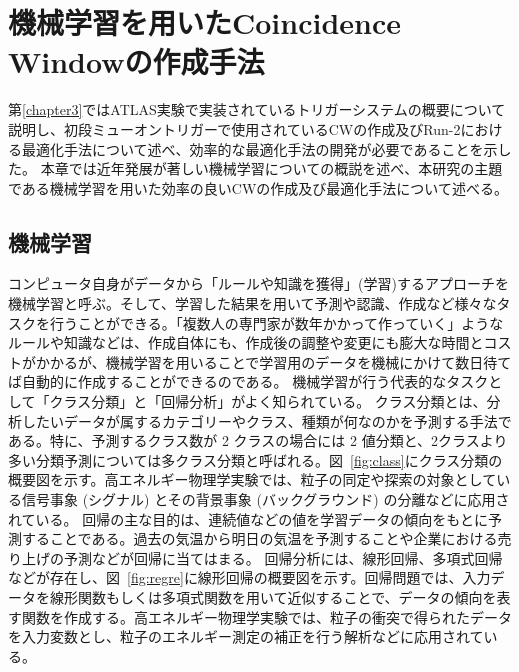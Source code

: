 \chapter{機械学習を用いたCoincidence Windowの作成手法}\label{chapter4}
第\ref{chapter3}ではATLAS実験で実装されているトリガーシステムの概要について説明し、初段ミューオントリガーで使用されているCWの作成及びRun-2における最適化手法について述べ、効率的な最適化手法の開発が必要であることを示した。
本章では近年発展が著しい機械学習についての概説を述べ、本研究の主題である機械学習を用いた効率の良いCWの作成及び最適化手法について述べる。

\section{機械学習}\label{回帰分析}
コンピュータ自身がデータから「ルールや知識を獲得」(学習)するアプローチを機械学習と呼ぶ。そして、学習した結果を用いて予測や認識、作成など様々なタスクを行うことができる。「複数人の専門家が数年かかって作っていく」ようなルールや知識などは、作成自体にも、作成後の調整や変更にも膨大な時間とコストがかかるが、機械学習を用いることで学習用のデータを機械にかけて数日待てば自動的に作成することができるのである。
機械学習が行う代表的なタスクとして「クラス分類」と「回帰分析」がよく知られている。
クラス分類とは、分析したいデータが属するカテゴリーやクラス、種類が何なのかを予測する手法である。特に、予測するクラス数が 2 クラスの場合には 2 値分類と、2クラスより多い分類予測については多クラス分類と呼ばれる。図~\ref{fig:class}にクラス分類の概要図を示す。高エネルギー物理学実験では、粒子の同定や探索の対象としている信号事象 (シグナル) とその背景事象 (バックグラウンド) の分離などに応用されている。
回帰の主な目的は、連続値などの値を学習データの傾向をもとに予測することである。過去の気温から明日の気温を予測することや企業における売り上げの予測などが回帰に当てはまる。
回帰分析には、線形回帰、多項式回帰などが存在し、図~\ref{fig:regre}に線形回帰の概要図を示す。回帰問題では、入力データを線形関数もしくは多項式関数を用いて近似することで、データの傾向を表す関数を作成する。高エネルギー物理学実験では、粒子の衝突で得られたデータを入力変数とし、粒子のエネルギー測定の補正を行う解析などに応用されている。

